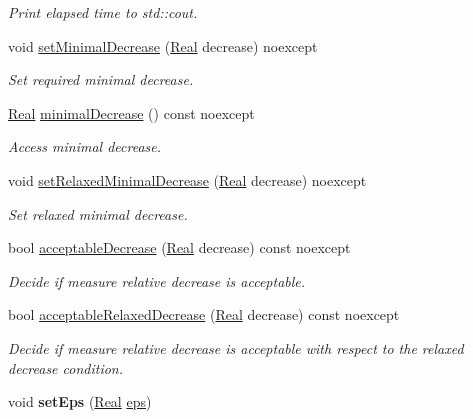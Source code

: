 \begin{DoxyCompactItemize}
\begin{DoxyCompactList}\small\item\em \-Print elapsed time to std\-::cout. \end{DoxyCompactList}\item 
void \hyperlink{classSpacy_1_1Mixin_1_1DecreaseCondition_aabc5e2473edace0c87da7fbd9fa0ae61}{set\-Minimal\-Decrease} (\hyperlink{classSpacy_1_1Real}{\-Real} decrease) noexcept
\begin{DoxyCompactList}\small\item\em \-Set required minimal decrease. \end{DoxyCompactList}\item 
\hyperlink{classSpacy_1_1Real}{\-Real} \hyperlink{classSpacy_1_1Mixin_1_1DecreaseCondition_aeeda8b1d9f177fe5dd532e42de09ab44}{minimal\-Decrease} () const noexcept
\begin{DoxyCompactList}\small\item\em \-Access minimal decrease. \end{DoxyCompactList}\item 
void \hyperlink{classSpacy_1_1Mixin_1_1DecreaseCondition_a86d6a8c8fc683c31572fd818a102a362}{set\-Relaxed\-Minimal\-Decrease} (\hyperlink{classSpacy_1_1Real}{\-Real} decrease) noexcept
\begin{DoxyCompactList}\small\item\em \-Set relaxed minimal decrease. \end{DoxyCompactList}\item 
bool \hyperlink{classSpacy_1_1Mixin_1_1DecreaseCondition_a69c0c90daf14fc40461876f71c49ffc2}{acceptable\-Decrease} (\hyperlink{classSpacy_1_1Real}{\-Real} decrease) const noexcept
\begin{DoxyCompactList}\small\item\em \-Decide if measure relative decrease is acceptable. \end{DoxyCompactList}\item 
bool \hyperlink{classSpacy_1_1Mixin_1_1DecreaseCondition_a5ffb5bc008544db96d935a0ca34dcd24}{acceptable\-Relaxed\-Decrease} (\hyperlink{classSpacy_1_1Real}{\-Real} decrease) const noexcept
\begin{DoxyCompactList}\small\item\em \-Decide if measure relative decrease is acceptable with respect to the relaxed decrease condition. \end{DoxyCompactList}\item 
\hypertarget{classSpacy_1_1Mixin_1_1Eps_a6b4c38a60848c0ab665fb3a81e181786}{void {\bfseries set\-Eps} (\hyperlink{classSpacy_1_1Real}{\-Real} \hyperlink{classSpacy_1_1Mixin_1_1Eps_a812b99b0abc1d78a34b4114907f23f52}{eps})}\label{classSpacy_1_1Mixin_1_1Eps_a6b4c38a60848c0ab665fb3a81e181786}


\end{DoxyCompactItemize}
